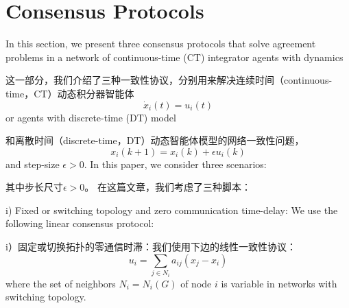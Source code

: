 \documentclass{article}
\begin{document}
\section{Consensus Protocols}
{\color[gray]{0.5}
\noindent In this section, we present three consensus protocols that solve agreement problems in a network of continuous-time (CT) {\color{green}integrator agents} with dynamics
}

\noindent 这一部分，我们介绍了三种一致性协议，分别用来解决连续时间（continuous-time，CT）动态积分器智能体
\begin{equation}
    \dot{x}_i(t) = u_i(t)
    \tag{4}
    \label{4}
\end{equation}
{\color[gray]{0.5}
\noindent or agents with discrete-time (DT) model
}

\noindent 和离散时间（discrete-time，DT）动态智能体模型的网络一致性问题，
\begin{equation}
    x_i(k+1) = x_i(k)+\epsilon u_i(k)
    \tag{5}
    \label{5}
\end{equation}
{\color[gray]{0.5}
\noindent and step-size $\epsilon>0$. 
In this paper, we consider three scenarios:
}

\noindent 其中步长尺寸$\epsilon>0$。
在这篇文章，我们考虑了三种脚本：

{\color[gray]{0.5}
i) Fixed or switching topology and zero communication time-delay: We use the following linear consensus protocol:
}

i）固定或切换拓扑的零通信时滞：我们使用下边的线性一致性协议：
\begin{equation}
    u_i = \sum_{j\in N_i}a_{ij}(x_j-x_i)
    \tag{A1}
    \label{A1}
\end{equation}
{\color[gray]{0.5}
\noindent where the set of neighbors $N_i=N_i(G)$ of node $i$ is variable in networks with switching topology.
}
\end{document}
